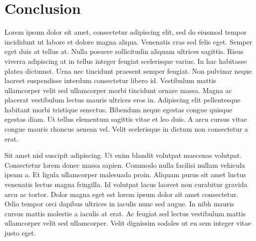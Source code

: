 \documentclass[12pt]{article}
\begin{document}
\newpage


\section{Conclusion}
Lorem ipsum dolor sit amet, consectetur adipiscing elit, sed do eiusmod tempor incididunt ut labore et dolore magna aliqua. Venenatis cras sed felis eget. Semper eget duis at tellus at. Nulla posuere sollicitudin aliquam ultrices sagittis. Risus viverra adipiscing at in tellus integer feugiat scelerisque varius. In hac habitasse platea dictumst. Urna nec tincidunt praesent semper feugiat. Non pulvinar neque laoreet suspendisse interdum consectetur libero id. Vestibulum mattis ullamcorper velit sed ullamcorper morbi tincidunt ornare massa. Magna ac placerat vestibulum lectus mauris ultrices eros in. Adipiscing elit pellentesque habitant morbi tristique senectus. Bibendum neque egestas congue quisque egestas diam. Ut tellus elementum sagittis vitae et leo duis. A arcu cursus vitae congue mauris rhoncus aenean vel. Velit scelerisque in dictum non consectetur a erat.\par
Sit amet nisl suscipit adipiscing. Ut enim blandit volutpat maecenas volutpat. Consectetur lorem donec massa sapien. Commodo nulla facilisi nullam vehicula ipsum a. Et ligula ullamcorper malesuada proin. Aliquam purus sit amet luctus venenatis lectus magna fringilla. Id volutpat lacus laoreet non curabitur gravida arcu ac tortor. Dolor magna eget est lorem ipsum dolor sit amet consectetur. Odio tempor orci dapibus ultrices in iaculis nunc sed augue. In nibh mauris cursus mattis molestie a iaculis at erat. Ac feugiat sed lectus vestibulum mattis ullamcorper velit sed ullamcorper. Velit dignissim sodales ut eu sem integer vitae justo eget.\par


\printindex
\end{document}
